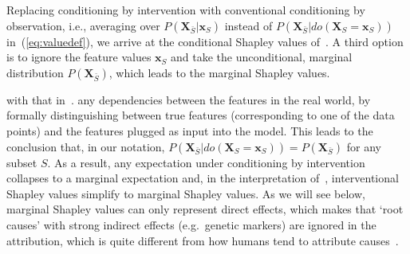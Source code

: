 \documentclass{article}
\newcommand{\vX}{\mathbf{X}}
\newcommand{\vx}{\mathbf{x}}
\newcommand{\dodo}{\mathit{do}}
\newcommand{\lvdo}[1]{\dodo(\vX_{#1} = \vx_{#1})}
\begin{document}
Replacing conditioning by intervention with conventional conditioning by observation, i.e., averaging over $P(\vX_{\bar{S}}|\vx_{S})$ instead of $P(\vX_{\bar{S}}|\lvdo{S})$ in~(\ref{eq:valuedef}), we arrive at the conditional Shapley values of~\cite{aas2019explaining,lundberg2018consistent}. A third option is to ignore the feature values $\vx_S$ and take the unconditional, marginal distribution $P(\vX_{\bar{S}})$, which leads to the marginal Shapley values.

 with that in~\cite{datta2016algorithmic,janzing2019feature,lundberg2020local}.  any dependencies between the features in the real world, by formally distinguishing between true features (corresponding to one of the data points) and the features plugged as input into the model. This leads to the conclusion that, in our notation, $P(\vX_{\bar{S}}|\lvdo{S}) = P(\vX_{\bar{S}})$ for any subset $S$. As a result, any expectation under conditioning by intervention collapses to a marginal expectation and, in the interpretation of~\cite{datta2016algorithmic,janzing2019feature,lundberg2020local}, interventional Shapley values  simplify to marginal Shapley values. As we will see below, marginal Shapley values can only represent direct effects, which makes that `root causes' with strong indirect effects (e.g.\ genetic markers) are ignored in the attribution, which is quite different from how humans tend to attribute causes~\cite{sober1988apportioning}. 
\end{document}
